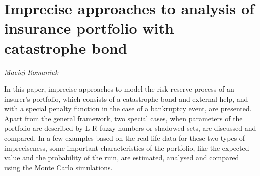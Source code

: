 \documentclass[../booklet.tex]{subfiles}
\begin{document}
\section[Imprecise approaches to analysis of insurance portfolio with catastrophe bond. {\it Maciej Romaniuk}]{Imprecise approaches to analysis of insurance portfolio with catastrophe bond}

\begin{center}
  {\it Maciej Romaniuk}
\end{center}

\vskip 0.8cm


In this paper, imprecise approaches to model the risk reserve process of an insurer's portfolio, which consists of a catastrophe bond and external help, and with a special penalty function in the case of a bankruptcy event, are presented.
Apart from the general framework, two special cases, when parameters of the portfolio are described by L-R fuzzy numbers or shadowed sets, are discussed and compared.
In a few examples based on the real-life data for these two types of impreciseness, some important characteristics of the portfolio, like the expected value and the probability of the ruin, are estimated, analysed and compared using the Monte Carlo simulations.  

\end{document}
